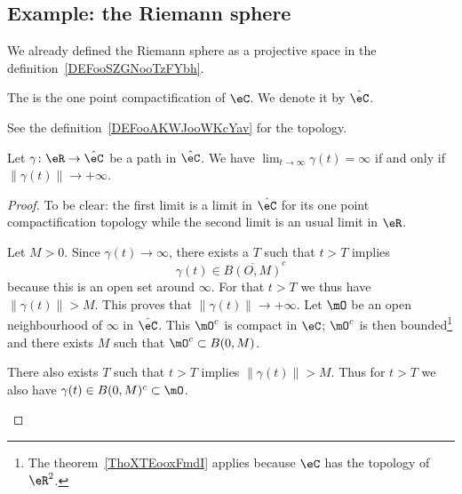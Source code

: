 \subsection{Example: the Riemann sphere}
\label{SEBSECooLJSEooNlyFYv}

We already defined the Riemann sphere as a projective space in the definition~\ref{DEFooSZGNooTzFYbh}.

\begin{definition}      \label{DEFooMAHAooGUYyqU}
	The  is the one point compactification of \( \eC\). We denote it by \( \hat \eC\).
\end{definition}
See the definition~\ref{DEFooAKWJooWKcYav} for the topology.

\begin{proposition}     \label{PROPooDTPKooYcSzYq}
	Let \( \gamma\colon \eR\to \hat \eC\) be a path in \( \hat \eC\). We have \( \lim_{t\to \infty} \gamma(t)=\infty\) if and only if \( \| \gamma(t) \|\to +\infty\).
\end{proposition}

\begin{proof}
	To be clear: the first limit is a limit in \( \hat \eC\) for its one point compactification topology while the second limit is an usual limit in \( \eR\).
	\begin{subproof}
		\spitem[\( \Rightarrow\)]
		Let \( M>0\). Since \( \gamma(t)\to \infty\), there exists a \( T\) such that \( t>T\) implies
		\begin{equation}
			\gamma(t)\in\overline{ B(O,M) }^c
		\end{equation}
		because this is an open set around \( \infty\). For that \( t>T\) we thus have \( \| \gamma(t) \|>M\). This proves that \( \| \gamma(t) \|\to +\infty\).
		\spitem[\( \Leftarrow\)]
		Let \( \mO\) be an open neighbourhood of \( \infty\) in \( \hat \eC\). This \( \mO^c\) is compact in \( \eC\); \( \mO^c\) is then bounded\footnote{The theorem~\ref{ThoXTEooxFmdI} applies because \( \eC\) has the topology of \( \eR^2\).} and there exists \( M\) such that \( \mO^c\subset B(0,M)\).

		There also exists \( T\) such that \( t>T\) implies \( \| \gamma(t) \|>M\). Thus for \( t>T\) we also have \( \gamma(t)\in B(0,M)^c\subset \mO\).
	\end{subproof}
\end{proof}

